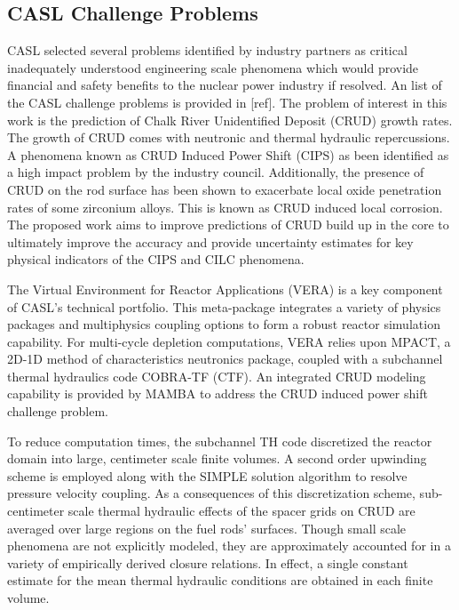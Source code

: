 \subsection{CASL Challenge Problems}

CASL selected several problems identified by industry partners as critical
inadequately understood engineering scale phenomena which would provide financial and
safety benefits to the nuclear power industry if resolved.  An list of the CASL
challenge problems is provided in [ref].  The problem of interest in this
work is the prediction of Chalk River Unidentified Deposit (CRUD) growth rates.
The growth of CRUD comes with neutronic and thermal hydraulic repercussions.  A
phenomena known as CRUD Induced Power Shift (CIPS) as been identified as a high
impact problem by the industry council.  Additionally, the presence of CRUD on the rod
surface has been shown to exacerbate local oxide penetration rates of some zirconium alloys.
This is known as CRUD induced local corrosion.
The proposed work aims to improve predictions of CRUD build up in the core to ultimately improve the
accuracy and provide uncertainty estimates for key physical indicators of the CIPS and CILC phenomena.

The Virtual Environment for Reactor Applications (VERA) is a key component of
CASL's technical portfolio.  This meta-package integrates a variety of physics
packages and multiphysics coupling options to form a robust reactor simulation
capability.  For multi-cycle depletion computations, VERA relies upon MPACT, a
2D-1D method of characteristics neutronics package, coupled with a subchannel
thermal hydraulics code COBRA-TF (CTF).  An integrated CRUD modeling capability
is provided by MAMBA to address the CRUD induced power shift challenge problem.

To reduce computation times, the subchannel TH code discretized the reactor
domain into large, centimeter scale finite volumes.  A second order upwinding
scheme is employed along with the SIMPLE solution algorithm to resolve pressure
velocity coupling.  As a consequences of this discretization scheme, sub-centimeter scale
thermal hydraulic effects of the spacer grids on CRUD are averaged over
large regions on the fuel rods' surfaces.  Though small scale phenomena are not
explicitly modeled, they are approximately accounted for in a variety of empirically derived
closure relations.  In effect, a single constant estimate for the mean thermal
hydraulic conditions are obtained in each finite volume.

